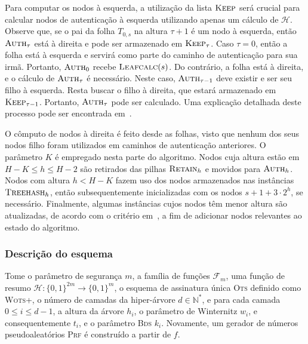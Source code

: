 \documentclass{ufsctex/ufsctex}
\newcommand{\hh}{\mathcal{H}}
\newcommand{\binwds}[1]{\{0, 1\}^{#1}}
\newcommand{\bds}{\textsc{Bds}}
\newcommand{\wotsplus}{\textsc{Wots+}}
\begin{document}
Para computar os nodos à esquerda, a utilização da lista $\textsc{Keep}$ será
crucial para calcular nodos de autenticação à esquerda utilizando apenas um
cálculo de $\hh{}$. Observe que, se o pai da folha $T_{0, s}$ na altura $\tau +
1$ é um nodo à esquerda, então $\textsc{Auth}_{\tau}$ está à direita e pode ser
armazenado em $\textsc{Keep}_{\tau}$. Caso $\tau = 0$, então a folha está à
esquerda e servirá como parte do caminho de autenticação para sua irmã.
Portanto, $\textsc{Auth}_{0}$ recebe $\textsc{Leafcalc}(s)$. Do contrário, a
folha está à direita, e o cálculo de $\textsc{Auth}_{\tau}$ é necessário. Neste
caso, $\textsc{Auth}_{\tau - 1}$ deve existir e ser seu filho à esquerda. Resta
buscar o filho à direita, que estará armazenado em $\textsc{Keep}_{\tau - 1}$.
Portanto, $\textsc{Auth}_{\tau}$ pode ser calculado. Uma explicação detalhada
deste processo pode ser encontrada em~\cite[Seção
2.1]{Buchmann:inproc:2008:oct}.

O cômputo de nodos à direita é feito desde as folhas, visto que nenhum dos seus
nodos filho foram utilizados em caminhos de autenticação anteriores. O
parâmetro $K$ é empregado nesta parte do algoritmo. Nodos cuja altura estão em
$H - K \leq h \leq H - 2$ são retirados das pilhas $\textsc{Retain}_{h}$ e
movidos para $\textsc{Auth}_{h}$. Nodos com altura $h < H - K$ fazem uso dos
nodos armazenados nas instâncias $\textsc{Treehash}_{h}$, então
subsequentemente inicializadas com os nodos $s + 1 + 3 \cdot 2^{h}$, se
necessário. Finalmente, algumas instâncias cujos nodos têm menor altura são
atualizadas, de acordo com o critério em~\cite[Seção 4.5]{Bernstein:book:2008},
a fim de adicionar nodos relevantes ao estado do algoritmo.

\subsubsection{Descrição do esquema}\label{subsubsection:xmssmt}

Tome o parâmetro de segurança $m$, a família de funções $\mathcal{F}_{m}$, uma
função de resumo $\hh{} : \binwds{2m} \longrightarrow \binwds{m}$, o esquema de
assinatura única \textsc{Ots} definido como \wotsplus{}, o número de camadas da
hiper-árvore $d \in \mathbb{N}^{*}$, e para cada camada $0 \leq i \leq d - 1$,
a altura da árvore $h_{i}$, o parâmetro de Winternitz $w_{i}$, e
consequentemente $t_{i}$, e o parâmetro \bds{} $k_{i}$. Novamente, um gerador
de números pseudoaleatórios \textsc{Prf} é construído a partir de $f$.
\end{document}
